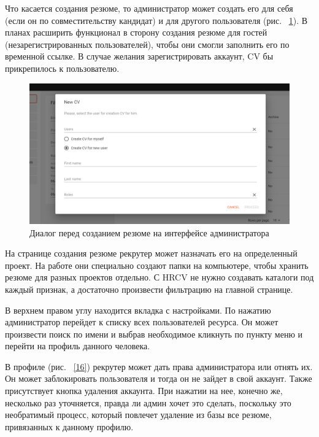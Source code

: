 \documentclass[12pt, a4paper]{diplom}
\begin{document}
Что касается создания резюме, то администратор может создать его для себя (если он по совместительству кандидат) и для другого пользователя (рис. ~\ref{15}). В планах расширить функционал в сторону создания резюме для гостей (незарегистрированных пользователей), чтобы
они смогли заполнить его по временной ссылке. В случае желания зарегистрировать аккаунт, CV бы прикрепилось к пользователю.

\begin{figure}[!ht]
\centering
\includegraphics[width=1\textwidth]{resources/newcvdialog.png}
\caption{Диалог перед созданием резюме на интерфейсе администратора}
\label{15}
\end{figure}

На странице создания резюме рекрутер может назначать его на определенный проект. На работе они специально создают папки на компьютере, чтобы хранить резюме для разных проектов отдельно. С HRCV не нужно создавать каталоги под каждый признак, а достаточно произвести фильтрацию на главной странице.

В верхнем правом углу находится вкладка с настройками. По нажатию администратор перейдет к списку всех пользователей ресурса. Он может произвести поиск по имени и выбрав необходимое кликнуть по пункту меню и перейти на профиль данного человека.

В профиле (рис. ~\ref{16}) рекрутер может дать права администратора или отнять их. Он может заблокировать пользователя и тогда он не зайдет в свой аккаунт.
Также присутствует кнопка удаления аккаунта. При нажатии на нее, конечно же, несколько раз уточняется, правда ли админ хочет это сделать, поскольку это необратимый процесс, который повлечет удаление из базы все резюме, привязанных к данному профилю.
\end{document}
